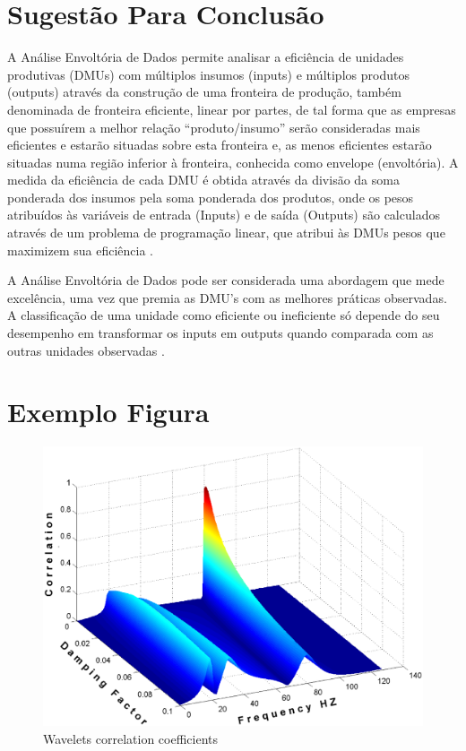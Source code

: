\section{Sugestão Para Conclusão}


A Análise Envoltória de Dados permite analisar a eficiência de unidades produtivas (DMUs) com múltiplos insumos (inputs) e múltiplos produtos (outputs) através da construção de uma fronteira de produção, também denominada de fronteira eficiente, linear por partes, de tal forma que as empresas que possuírem a melhor relação “produto/insumo” serão consideradas mais eficientes e estarão situadas sobre
esta fronteira e, as menos eficientes estarão situadas numa região inferior à fronteira, conhecida como envelope (envoltória).
A medida da eficiência de cada DMU é obtida através da divisão da soma ponderada dos insumos pela soma ponderada dos produtos, onde os pesos atribuídos às variáveis de entrada (Inputs) e de saída (Outputs) são calculados através de um problema de programação linear, que atribui às DMUs pesos que maximizem sua eficiência .

A Análise Envoltória de Dados pode ser considerada uma abordagem que mede excelência, uma vez que premia as DMU’s com as melhores práticas observadas. A classificação de uma unidade como eficiente ou ineficiente só depende do seu desempenho em transformar os inputs em outputs quando comparada com as outras unidades observadas .




\section{Exemplo Figura}

\begin{figure}[h]
	\centering
	\label{fig01}
		\includegraphics[keepaspectratio=true,scale=0.3]{figuras/fig01.eps}
	\caption{Wavelets correlation coefficients}
\end{figure}

